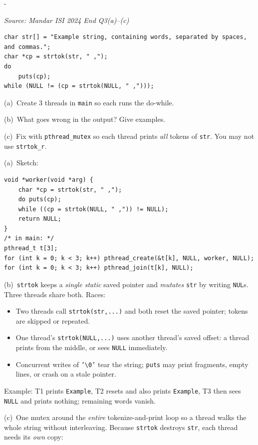 \documentclass[11pt,a4paper]{article}
\makeatletter
\newcommand{\keepspace}[1]{\par\penalty-100\begingroup
  \setlength{\dimen@}{#1}\dimen@ii\pagegoal\advance\dimen@ii-\pagetotal
  \ifdim\dimen@>\dimen@ii\ifdim\dimen@ii>\z@\vfil\fi\break\fi\endgroup}
\newcounter{qn}[section]
\newenvironment{Qn}[4]{%
  \refstepcounter{qn}\keepspace{7\baselineskip}%
  \begin{tcolorbox}[qboxstyle, title={Q\thesection.\theqn\ \ [#1 \textbar\ #2]\ \ #4}]%
  {\footnotesize\color{g3}\textit{Source: #3}}\par\smallskip%
}{%
  \end{tcolorbox}%
}
\newenvironment{Sol}{%
  \begin{tcolorbox}[sboxstyle, title={Solution}]%
}{%
  \end{tcolorbox}\vspace{0.35em}%
}
\makeatother
\begin{document}
\begin{Qn}{Hard}{Lect 16--17}{Mandar ISI 2024 End Q3(a)--(c)}{Three threads on \texttt{strtok}}
\begin{lstlisting}[numbers=none]
char str[] = "Example string, containing words, separated by spaces, and commas.";
char *cp = strtok(str, " ,");
do
    puts(cp);
while (NULL != (cp = strtok(NULL, " ,")));
\end{lstlisting}

(a)~Create 3 threads in \texttt{main} so each runs the do-while.

(b)~What goes wrong in the output? Give examples.

(c)~Fix with \texttt{pthread\_mutex} so each thread prints \emph{all} tokens of \texttt{str}. You may not use \texttt{strtok\_r}.
\end{Qn}
\begin{Sol}
(a)~Sketch:
\begin{lstlisting}[numbers=none]
void *worker(void *arg) {
    char *cp = strtok(str, " ,");
    do puts(cp);
    while ((cp = strtok(NULL, " ,")) != NULL);
    return NULL;
}
/* in main: */
pthread_t t[3];
for (int k = 0; k < 3; k++) pthread_create(&t[k], NULL, worker, NULL);
for (int k = 0; k < 3; k++) pthread_join(t[k], NULL);
\end{lstlisting}

(b)~\texttt{strtok} keeps a \emph{single static} saved pointer and \emph{mutates} \texttt{str} by writing \texttt{NUL}s. Three threads share both. Races:
\begin{itemize}
\item Two threads call \texttt{strtok(str,...)} and both reset the saved pointer; tokens are skipped or repeated.
\item One thread's \texttt{strtok(NULL,...)} uses another thread's saved offset: a thread prints from the middle, or sees \texttt{NULL} immediately.
\item Concurrent writes of \texttt{'\textbackslash0'} tear the string; \texttt{puts} may print fragments, empty lines, or crash on a stale pointer.
\end{itemize}
Example: T1 prints \texttt{Example}, T2 resets and also prints \texttt{Example}, T3 then sees \texttt{NULL} and prints nothing; remaining words vanish.

(c)~One mutex around the \emph{entire} tokenize-and-print loop so a thread walks the whole string without interleaving. Because \texttt{strtok} destroys \texttt{str}, each thread needs its \emph{own} copy:


\end{Sol}
\end{document}
